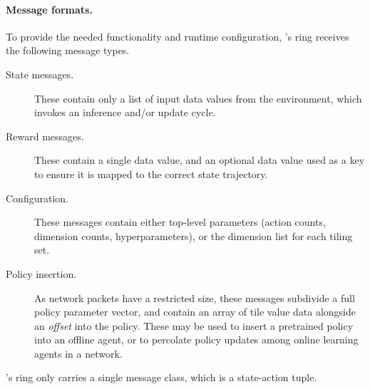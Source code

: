 \paragraph{Message formats.}
To provide the needed functionality and runtime configuration, \approachshort{}'s \inring{} ring receives the following message types.
\begin{description}
	\item[State messages.] These contain only a list of input data values from the environment, which invokes an inference and/or update cycle.
	\item[Reward messages.] These contain a single data value, and an optional data value used as a key to ensure it is mapped to the correct state trajectory.
	\item[Configuration.] These messages contain either top-level parameters (action counts, dimension counts, hyperparameters), or the dimension list for each tiling set.
	\item[Policy insertion.] As network packets have a restricted size, these messages subdivide a full policy parameter vector, and contain an array of tile value data alongside an \emph{offset} into the policy. These may be used to insert a pretrained policy into an offline agent, or to percolate policy updates among online learning agents in a network.
\end{description}
\approachshort{}'s \outring{} ring only carries a single message class, which is a state-action tuple.

%
%	

